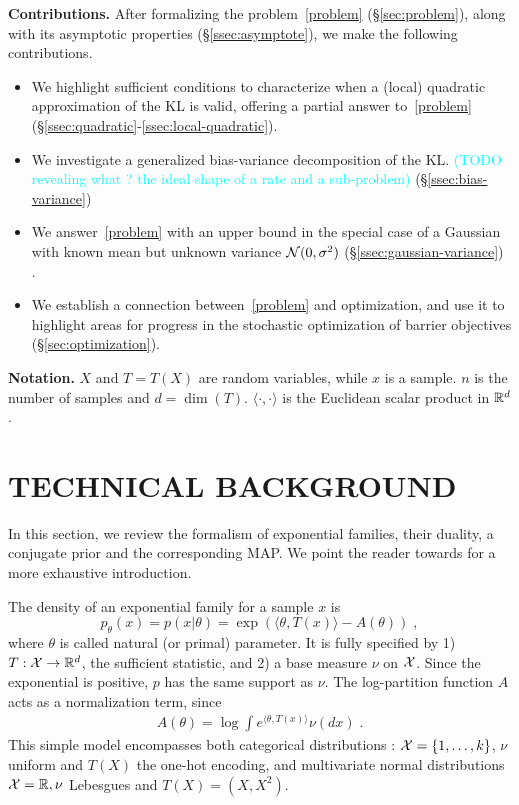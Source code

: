 \documentclass[twoside]{article}
\let\oldsection\section
\renewcommand{\section}[1]{\oldsection{\texorpdfstring{\uppercase{#1}}{#1}}}
\newcommand{\rlp}[1]{\textcolor{BrickRed}{(RLP:#1)}}
\newcommand{\TODO}[1]{\textcolor{cyan}{(TODO #1)}}
\newcommand{\logpart}{A}
\newcommand{\nat}{\theta}
\begin{document}

{\bf Contributions.}
After formalizing the problem~\eqref{problem} (\S\ref{sec:problem}), along with its asymptotic properties (\S\ref{ssec:asymptote}), we make the following contributions.
\begin{itemize}
	\itemsep0em
	\item We highlight sufficient conditions to characterize when a (local) quadratic approximation of the KL is valid, offering a partial answer to~\eqref{problem} (\S\ref{ssec:quadratic}-\ref{ssec:local-quadratic}).
	\item We investigate a generalized bias-variance decomposition of the KL\citep{pfau2013generalized}. \TODO{revealing what ? the ideal shape of a rate and a sub-problem} (\S\ref{ssec:bias-variance})
	\item We answer~\eqref{problem} with an upper bound in the special case of a Gaussian with known mean but unknown variance ${\mathcal N}(0,\sigma^2)$ (\S\ref{ssec:gaussian-variance}) .
	\item We establish a connection between~\eqref{problem} and optimization, and use it to highlight areas for progress in the stochastic optimization of barrier objectives (\S\ref{sec:optimization}).
\end{itemize}


{\bf Notation.}
$X$ and $T=T(X)$ are random variables, while $x$ is a sample.
$n$ is the number of samples and $d= \dim(T)$.
$\langle \cdot , \cdot \rangle$ is the Euclidean scalar product in $\mathbb{R}^d$.


\section{Technical background}
\label{sec:background}
In this section, we review the formalism of exponential families, their duality, a conjugate prior and the corresponding MAP.
We point the reader towards \citet[Chapter 3]{wainwright2008graphical} for a more exhaustive introduction.


The density of an exponential family for a sample $x$ is
\begin{equation}
	 p_\nat(x) = p(x|\nat) = \exp( \langle \nat, T(x) \rangle - \logpart(\nat)) \; ,
	 \label{eq:def_expfamily}
\end{equation}
where  $\nat$ is called natural (or primal) parameter.
It is fully specified by 1) $T: {\mathcal X} \rightarrow \mathbb{R}^d$, the sufficient statistic,
and 2) a base measure $\nu$ on ${\mathcal X}$.
Since the exponential is positive, $p$ has the same support as $\nu$.
The log-partition function $\logpart$ acts as a normalization term, since
\begin{align}
    \logpart(\nat) = \log \int e^{\langle \nat, T(x) \rangle} \nu(dx) \;.
\end{align}
This simple model encompasses both categorical distributions : ${\mathcal X} = \{1, \dots, k\}$, $\nu$ uniform and $T(X)$  the one-hot encoding, and multivariate normal distributions ${\mathcal X}=\mathbb{R}, \nu$ Lebesgues and $T(X)=(X, X^2)$.
\end{document}
